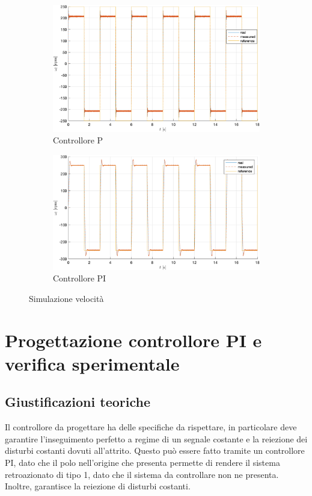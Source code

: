 \documentclass[a4paper, 11pt]{article}
\begin{document}
\begin{figure}[H]
    \centering
    \begin{subfigure}{0.45\linewidth}
        \centering
        \includegraphics[width=\linewidth]{./Images/Gesu.png}
        \caption{Controllore P}
        \label{Lab5:P}
    \end{subfigure}
    \hfill
    \begin{subfigure}{0.45\linewidth}
        \centering
        \includegraphics[width=\linewidth]{./Images/Gesu2.png}
        \caption{Controllore PI}
        \label{Lab5:PI}
    \end{subfigure}
    \caption{Simulazione velocità}
\end{figure}

\section{Progettazione controllore PI e verifica sperimentale}
\subsection{Giustificazioni teoriche}
Il controllore da progettare ha delle specifiche da rispettare, in particolare deve garantire l'inseguimento perfetto a regime di un segnale costante e la reiezione dei disturbi costanti dovuti all'attrito. Questo può essere fatto tramite un controllore PI, dato che il polo nell'origine che presenta permette di rendere il sistema retroazionato di tipo 1, dato che il sistema da controllare non ne presenta. Inoltre, garantisce la reiezione di disturbi costanti. 
\end{document}
